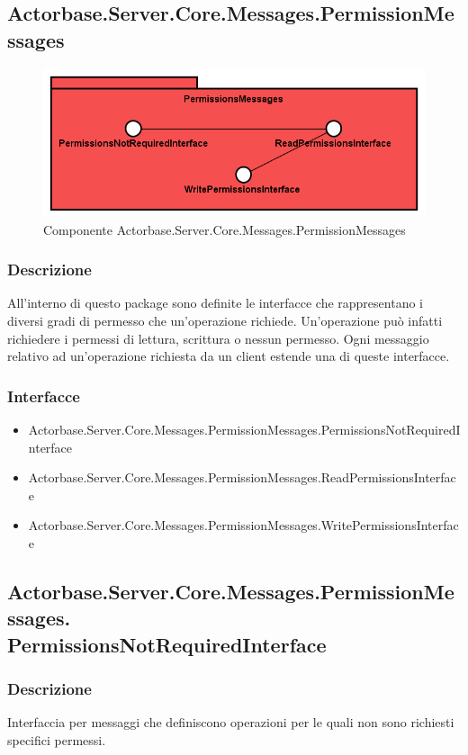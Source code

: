 \documentclass[a4paper]{article}
\begin{document}
			\subsection{Actorbase.Server.Core.Messages.PermissionMessages}
			\begin{figure} [H]
			\centering
			\includegraphics[scale=0.65]{Server/Package/PermissionsMessagesLevel.png}
			\caption{Componente Actorbase.Server.Core.Messages.PermissionMessages}
			\end{figure}
			\subsubsection{Descrizione}
				All'interno di questo package sono definite le interfacce che rappresentano i diversi gradi di permesso che un'operazione richiede. Un'operazione può infatti richiedere i permessi di lettura, scrittura o nessun permesso. Ogni messaggio relativo ad un'operazione richiesta da un client estende una di queste interfacce.
			\subsubsection{Interfacce}
			\begin{itemize}
				\item Actorbase.Server.Core.Messages.PermissionMessages.PermissionsNotRequiredInterface
				\item Actorbase.Server.Core.Messages.PermissionMessages.ReadPermissionsInterface
				\item Actorbase.Server.Core.Messages.PermissionMessages.WritePermissionsInterface
			\end{itemize}

			\subsection{Actorbase.Server.Core.Messages.PermissionMessages.\\ PermissionsNotRequiredInterface}
			\subsubsection{Descrizione}
				Interfaccia per messaggi che definiscono operazioni per le quali non sono richiesti specifici permessi.
\end{document}
